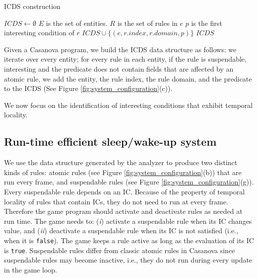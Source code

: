 \begin{algorithm}
\caption{ICDS construction}

\label{alg:icds_construction}
\begin{algorithmic}
\Statex
    \State $ICDS \gets \emptyset$
    \Statex
    \State $E$ is the set of entities.
\Statex
    \Statex
        \State $R$ is the set of rules in $e$
        \Statex
        \Statex
            \Statex
                \State $p$ is the first interesting condition of $r$
                \Statex
                \Statex
                    \State $ICDS \cup \lbrace (e,r.index,r.domain,p) \rbrace$
                    \Statex
                \EndIf
                \Statex
            \EndIf
            \Statex
        \EndFor
        \Statex
    \EndFor
    \Statex
    \State \Return $ICDS$
    \Statex
\EndFunction
\end{algorithmic}
\end{algorithm}


Given a Casanova program, we build the ICDS data structure as follows: we iterate over every entity; for every rule in each entity, if the rule is suspendable, interesting and the predicate does not contain fields that are affected by an atomic rule, we add the entity, the rule index, the rule domain, and the predicate to the ICDS (See Figure \ref{fig:system_configuration}(c)).

We now focus on the identification of interesting conditions that exhibit temporal locality.

\subsection{Run-time efficient sleep/wake-up system}

We use the data structure generated by the analyzer to produce two distinct kinds of rules: atomic rules (see Figure \ref{fig:system_configuration}(b)) that are run every frame, and suspendable rules (see Figure \ref{fig:system_configuration}(g)). Every suspendable rule depends on an IC. %
Because of the property of temporal locality of rules that contain ICs, they do not need to run at every frame. Therefore the game program should activate and deactivate rules as needed at run time. The game needs to: (\textit{i}) activate a suspendable rule when its IC changes value, and (\textit{ii}) deactivate a suspendable rule when its IC is not satisfied (i.e., when it is \texttt{false}). The game keeps a rule active as long as the evaluation of its IC is \texttt{true}. Suspendable rules differ from classic atomic rules in Casanova since suspendable rules may become inactive, i.e., they do not run during every update in the game loop.

